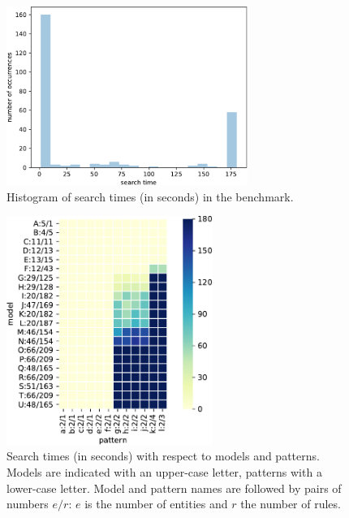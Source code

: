 \documentclass[a4paper,twoside]{article}
\begin{document}
\begin{figure}[t]
  \begin{center}
    \includegraphics[width=0.7\textwidth]{histogram}
  \end{center}
 
  \caption{Histogram of search times (in seconds) in the benchmark.}
  \label{fig:histo}
\end{figure} 

\begin{figure}[t!]
  \begin{center}
    \includegraphics[width=0.6\textwidth]{heatmap}
  \end{center}
  \caption{Search times (in seconds) with respect to models and patterns. Models are indicated with an upper-case letter,  patterns with a lower-case letter.
 Model and pattern names are followed by pairs of numbers $e/r$: $e$ is the number of entities and $r$ the number of rules.}
  \label{fig:heatmap}
\end{figure}
\end{document}
